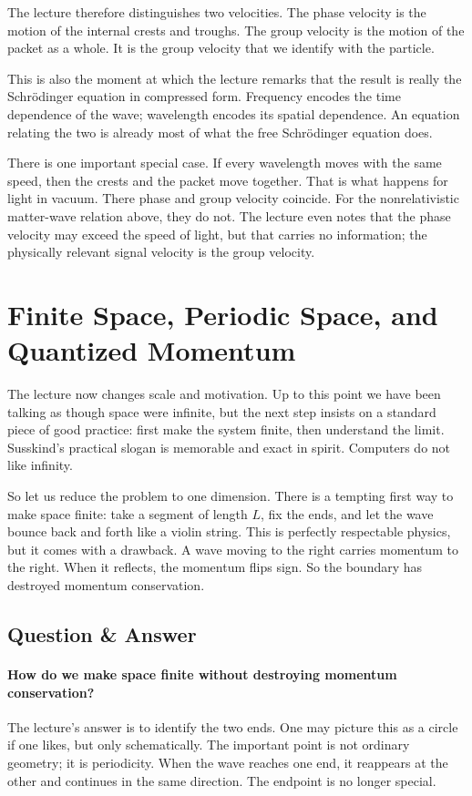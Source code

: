 The lecture therefore distinguishes two velocities. The phase velocity is the motion of the internal crests and troughs. The group velocity is the motion of the packet as a whole. It is the group velocity that we identify with the particle.

This is also the moment at which the lecture remarks that the result is really the Schr\"odinger equation in compressed form. Frequency encodes the time dependence of the wave; wavelength encodes its spatial dependence. An equation relating the two is already most of what the free Schr\"odinger equation does.

There is one important special case. If every wavelength moves with the same speed, then the crests and the packet move together. That is what happens for light in vacuum. There phase and group velocity coincide. For the nonrelativistic matter-wave relation above, they do not. The lecture even notes that the phase velocity may exceed the speed of light, but that carries no information; the physically relevant signal velocity is the group velocity.

\section{Finite Space, Periodic Space, and Quantized Momentum}

The lecture now changes scale and motivation. Up to this point we have been talking as though space were infinite, but the next step insists on a standard piece of good practice: first make the system finite, then understand the limit. Susskind's practical slogan is memorable and exact in spirit. Computers do not like infinity.

So let us reduce the problem to one dimension. There is a tempting first way to make space finite: take a segment of length \(L\), fix the ends, and let the wave bounce back and forth like a violin string. This is perfectly respectable physics, but it comes with a drawback. A wave moving to the right carries momentum to the right. When it reflects, the momentum flips sign. So the boundary has destroyed momentum conservation.

\subsection{Question \& Answer}
\paragraph{How do we make space finite without destroying momentum conservation?}
The lecture's answer is to identify the two ends. One may picture this as a circle if one likes, but only schematically. The important point is not ordinary geometry; it is periodicity. When the wave reaches one end, it reappears at the other and continues in the same direction. The endpoint is no longer special.

